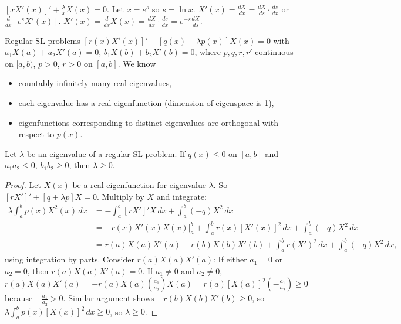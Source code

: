 \documentclass[]{article}
\begin{document}
\begin{example}
	[\S69.1] $[x X'(x)]' + \frac{\lambda}{x} X(x) = 0$. Let $x=e^s$ so $s=\ln x$. $X'(x) = \frac{dX}{dx} = \frac{dX}{ds}\cdot \frac{ds}{dx}$ or $\frac{d}{dx} [e^s X'(x)]$. $X'(x) = \frac{d}{dx} X(x) = \frac{dX}{dx} \cdot \frac{ds}{dx} = e^{-s} \frac{dX}{ds}$.
\end{example}
\begin{recall}
	Regular SL problems
	$[r(x) X'(x)]' + [q(x) + \lambda p(x)] X(x) = 0$ with $a_1 X(a) + a_2 X'(a) = 0$, $b_1 X(b) + b_2 X'(b) = 0$, where $p,q,r,r'$ continuous on $[a,b)$, $p>0$, $r>0$ on $[a,b]$.
	We know
	\begin{itemize}
		\item countably infinitely many real eigenvalues,
		\item each eigenvalue has a real eigenfunction (dimension of eigenspace is 1),
		\item eigenfunctions corresponding to distinct eigenvalues are orthogonal with respect to $p(x)$.
	\end{itemize}
\end{recall}
\begin{theorem}
	Let $\lambda$ be an eigenvalue of a regular SL problem. If $q(x)\leq 0$ on $[a,b]$ and $a_1 a_2 \leq 0$, $b_1b_2 \geq 0$, then $\lambda \geq 0$.
\end{theorem}
\begin{proof}
	Let $X(x)$ be a real eigenfunction for eigenvalue $\lambda$. So $[r X']' + [q + \lambda p] X = 0$. Multiply by $X$ and integrate: \begin{align*}\lambda \int_a^b p(x) X^2(x) \, dx &= - \int_a^b [rX']' X \, dx + \int_a^b (-q) X^2 \,dx \\ &= -r(x) X'(x) X(x) \big\rvert_a^b + \int_a^b r(x) [X'(x)]^2 \, dx + \int_a^b (-q) X^2 \, dx \\ &= r(a) X(a) X'(a) - r(b) X(b) X'(b) + \int_a^b r(X')^2 \, dx + \int_a^b (-q)X^2\, dx, \end{align*} using integration by parts. Consider $r(a) X(a) X'(a)$: If either $a_1=0$ or $a_2 =0$, then $r(a)X(a) X'(a) = 0$. If $a_1\neq 0$ and $a_2\neq 0$, $r(a) X(a) X'(a) = - r(a) X(a) \left( \frac{a_1}{a_2} \right) X(a) = r(a) [X(a)]^2 \left( -\frac{a_1}{a_2} \right) \geq 0$ because $-\frac{a_1}{a_2}>0$.
	Similar argument shows $-r(b)X(b)X'(b) \geq 0$, so $\lambda \int_a^b p(x) [X(x)]^2 \, dx \geq 0$, so $\lambda \geq 0$.
\end{proof}
\end{document}
